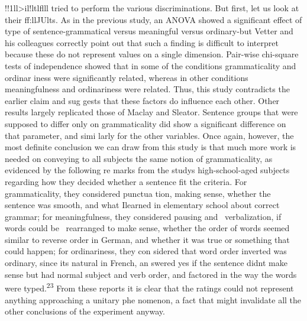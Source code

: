 \begin{styleTextbody}
!!1ll{\textquotesingle}{\textgreater}il!ltlflll tried to perform the various discriminations. But first, let us look at their ff:ll{\textquotesingle}JUlts. As in the previous study, an ANOVA showed a significant effect of type of sentence-grammatical versus meaningful versus ordinary-but Vetter and his colleagues correctly point out that such a finding is difficult to interpret because these do not represent values on a single dimension. Pair-wise chi-square tests of independence showed that in some of the conditions grammaticality and ordinar\- iness were significantly related, whereas in other conditions meaningfulness and ordinariness were related. Thus, this study contradicts the earlier claim and sug\- gests that these factors do influence each other. Other results largely replicated those of Maclay and Sleator. Sentence groups that were supposed to differ only on grammaticality did show a significant difference on that parameter, and simi\- larly for the other variables. Once again, however, the most definite conclusion we can draw from this study is that much more work is needed on conveying to all subjects the same notion of grammaticality, as evidenced by the following re\- marks from the study{\textquotesingle}s high-school-aged subjects regarding how they decided whether a sentence fit the criteria. For grammaticality, they considered punctua\- tion, making sense, whether the sentence was {\textquotedbl}smooth,{\textquotedbl} and {\textquotedbl}what Ilearned in elementary school about correct grammar{\textquotedbl}; for meaningfulness, they considered {\textquotedbl}pausing and \ verbalization,{\textquotedbl} {\textquotedbl}if words could be \ rearranged to make sense,{\textquotedbl} whether the {\textquotedbl}order of words seemed similar to reverse order in German,{\textquotedbl} and whether it was {\textquotedbl}true or something that could happen{\textquotedbl}; for ordinariness, they con\- sidered that {\textquotedbl}word order inverted was ordinary, since it{\textquotesingle}s natural in French,{\textquotedbl} an\- swered {\textquotedbl}yes{\textquotedbl} if the sentence {\textquotedbl}didn{\textquotesingle}t make sense but had normal subject and verb order,{\textquotedbl} and factored in {\textquotedbl}the way the words were typed.{\textquotedbl}\textsuperscript{23}\textsuperscript{ }From these reports it is clear that the ratings could not represent anything approaching a unitary phe\- nomenon, a fact that might invalidate all the other conclusions of the experiment anyway.
\end{styleTextbody}


